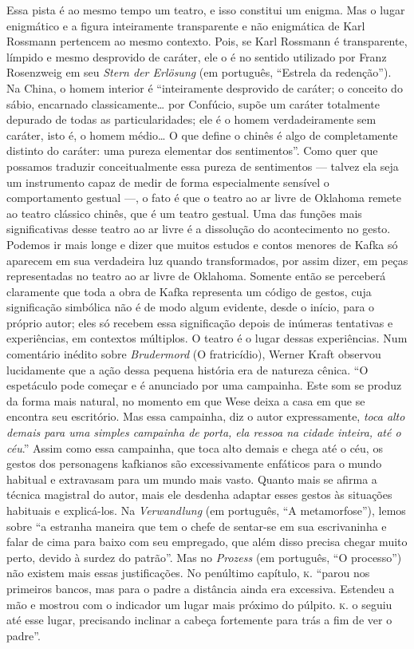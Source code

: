 Essa pista é ao mesmo tempo um teatro, e isso constitui um enigma. Mas o
lugar enigmático e a figura inteiramente transparente e não enigmática
de Karl Rossmann pertencem ao mesmo contexto. Pois, se Karl Rossmann é
transparente, límpido e mesmo desprovido de caráter, ele o é no sentido
utilizado por Franz Rosenzweig em seu \textit{Stern der Erlösung} (em português, ``Estrela da
redenção''). Na China, o homem interior é ``inteiramente desprovido de
caráter; o conceito do sábio, encarnado classicamente\ldots{} por Confúcio,
supõe um caráter totalmente depurado de todas as particularidades; ele é
o homem verdadeiramente sem caráter, isto é, o homem médio\ldots{} O que
define o chinês é algo de completamente distinto do caráter: uma pureza
elementar dos sentimentos''. Como quer que possamos traduzir
conceitualmente essa pureza de sentimentos --- talvez ela seja um
instrumento capaz de medir de forma especialmente sensível o
comportamento gestual ---, o fato é que o teatro ao ar livre de Oklahoma
remete ao teatro clássico chinês, que é um teatro gestual. Uma das
funções mais significativas desse teatro ao ar livre é a dissolução do
acontecimento no gesto. Podemos ir mais longe e dizer que muitos estudos
e contos menores de Kafka só aparecem em sua verdadeira luz quando
transformados, por assim dizer, em peças representadas no teatro ao ar
livre de Oklahoma. Somente então se perceberá claramente que toda a obra
de Kafka representa um código de gestos, cuja significação simbólica não
é de modo algum evidente, desde o início, para o próprio autor; eles só
recebem essa significação depois de inúmeras tentativas e experiências,
em contextos múltiplos. O teatro é o lugar dessas experiências. Num
comentário inédito sobre \textit{Brudermord} (O fratricídio), Werner Kraft
observou lucidamente que a ação dessa pequena história era de natureza
cênica. ``O espetáculo pode começar e é anunciado por uma campainha.
Este som se produz da forma mais natural, no momento em que Wese deixa a
casa em que se encontra seu escritório. Mas essa campainha, diz o autor
expressamente, \textit{toca alto demais para uma simples campainha de porta,
ela ressoa na cidade inteira, até o céu}.'' Assim como essa campainha,
que toca alto demais e chega até o céu, os gestos dos personagens
kafkianos são excessivamente enfáticos para o mundo habitual e
extravasam para um mundo mais vasto. Quanto mais se afirma a técnica
magistral do autor, mais ele desdenha adaptar esses gestos às situações
habituais e explicá-los. Na \textit{Verwandlung} (em português, ``A metamorfose''), lemos sobre
``a estranha maneira que tem o chefe de sentar-se em sua escrivaninha e
falar de cima para baixo com seu empregado, que além disso precisa
chegar muito perto, devido à surdez do patrão''. Mas no \textit{Prozess} (em português, ``O
processo'') não existem mais essas justificações. No penúltimo capítulo,
\textsc{k.} ``parou nos primeiros bancos, mas para o padre a distância ainda era
excessiva. Estendeu a mão e mostrou com o indicador um lugar mais
próximo do púlpito. \textsc{k.} o seguiu até esse lugar, precisando inclinar a
cabeça fortemente para trás a fim de ver o padre''.

